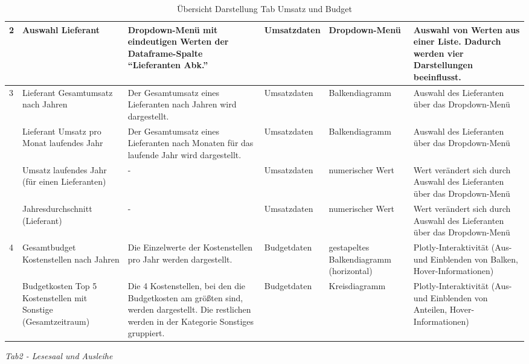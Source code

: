 \begin{table}[H]
\begin{adjustbox}{max width=\textwidth}
\begin{tabular}{p{}p{}p{}p{}p{}p{}}
                        \midrule
            2           &Auswahl  Lieferant &Dropdown-Menü mit eindeutigen Werten der Dataframe-Spalte \enquote{Lieferanten Abk.}&Umsatzdaten&Dropdown-Menü &Auswahl von Werten aus einer Liste. Dadurch werden vier Darstellungen beeinflusst.\\
            \midrule
            3           &Lieferant Gesamtumsatz nach Jahren&Der Gesamtumsatz eines Lieferanten nach Jahren wird dargestellt.   &Umsatzdaten    &Balkendiagramm    &Auswahl des Lieferanten über das Dropdown-Menü\\
                        &Lieferant Umsatz pro Monat laufendes Jahr&Der Gesamtumsatz eines Lieferanten nach Monaten für das laufende Jahr wird dargestellt.   &Umsatzdaten    &Balkendiagramm    &Auswahl des Lieferanten über das Dropdown-Menü\\
                        &Umsatz laufendes Jahr (für einen Lieferanten)&- &Umsatzdaten    &numerischer Wert    &Wert verändert sich durch Auswahl des Lieferanten über das Dropdown-Menü\\
                        &Jahresdurchschnitt (Lieferant)&- &Umsatzdaten    &numerischer Wert    &Wert verändert sich durch Auswahl des Lieferanten über das Dropdown-Menü\\
            \midrule
            4           &Gesamtbudget Kostenstellen nach Jahren&Die Einzelwerte der Kostenstellen pro Jahr werden dargestellt.&Budgetdaten    &gestapeltes Balkendiagramm (horizontal)    &Plotly-Interaktivität (Aus- und Einblenden von Balken, Hover-Informationen)\\
                        &Budgetkosten Top 5 Kostenstellen mit Sonstige (Gesamtzeitraum)&Die 4 Kostenstellen, bei den die Budgetkosten am größten sind, werden dargestellt. Die restlichen werden in der Kategorie Sonstiges gruppiert. &Budgetdaten    &Kreisdiagramm    &Plotly-Interaktivität (Aus- und Einblenden von Anteilen, Hover-Informationen)\\

        \bottomrule
        \end{tabular}
        \end{adjustbox}
        \caption{%
            Übersicht Darstellung Tab Umsatz und Budget
        }
        \label{tab:Darstellung Tab Umsatz und Budget}
        \end{table}
    \endgroup
    


\clearpage
\noindent
\textit{Tab2 - Lesesaal und Ausleihe}

